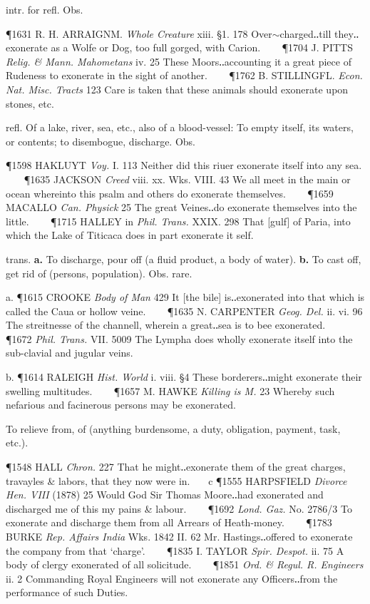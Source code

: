 \begin{description}[wide, labelwidth=!, labelindent=0pt]
\begin{myenumerate}
 intr. for refl. Obs.

\P 1631 R. H. ARRAIGNM.  \textit{Whole Creature} xiii. §1. 178 Over$\sim$charged‥till they‥exonerate as a Wolfe or Dog, too full gorged, with Carion.    
\P 1704 J. PITTS  \textit{Relig. \& Mann. Mahometans} iv. 25 These Moors‥accounting it a great piece of Rudeness to exonerate in the sight of another.    
\P 1762 B. STILLINGFL.  \textit{Econ. Nat. Misc. Tracts} 123 Care is taken that these animals should exonerate upon stones, etc.

 refl. Of a lake, river, sea, etc., also of a blood-vessel: To empty itself, its waters, or contents; to disembogue, discharge. Obs.

\P 1598 HAKLUYT  \textit{Voy.} I. 113 Neither did this riuer exonerate itself into any sea.    
\P 1635 JACKSON  \textit{Creed} viii. xx. Wks. VIII. 43 We all meet in the main or ocean whereinto this psalm and others do exonerate themselves.    
\P 1659 MACALLO  \textit{Can. Physick} 25 The great Veines‥do exonerate themselves into the little.    
\P 1715 HALLEY in  \textit{Phil. Trans.} XXIX. 298 That [gulf] of Paria, into which the Lake of Titicaca does in part exonerate it self.

 trans. \textbf{a.} To discharge, pour off (a fluid product, a body of water). \textbf{b.} To cast off, get rid of (persons, population). Obs. rare.

a. \P 1615 CROOKE  \textit{Body of Man} 429 It [the bile] is‥exonerated into that which is called the Caua or hollow veine.    
\P 1635 N. CARPENTER  \textit{Geog. Del.} ii. vi. 96 The streitnesse of the channell, wherein a great‥sea is to bee exonerated.    
\P 1672  \textit{Phil. Trans.} VII. 5009 The Lympha does wholly exonerate itself into the sub-clavial and jugular veins.

b. \P 1614 RALEIGH  \textit{Hist. World} i. viii. §4 These borderers‥might exonerate their swelling multitudes.    
\P 1657 M. HAWKE  \textit{Killing is M.} 23 Whereby such nefarious and facinerous persons may be exonerated.

 To relieve from, of (anything burdensome, a duty, obligation, payment, task, etc.).

\P 1548 HALL  \textit{Chron.} 227 That he might‥exonerate them of the great charges, travayles \& labors, that they now were in.    c 
\P 1555 HARPSFIELD  \textit{Divorce Hen. VIII} (1878) 25 Would God Sir Thomas Moore‥had exonerated and discharged me of this my pains \& labour.    
\P 1692  \textit{Lond. Gaz.} No. 2786/3 To exonerate and discharge them from all Arrears of Heath-money.    
\P 1783 BURKE  \textit{Rep. Affairs India} Wks. 1842 II. 62 Mr.  Hastings‥offered to exonerate the company from that ‘charge’.    
\P 1835 I. TAYLOR  \textit{Spir. Despot.} ii. 75 A body of clergy exonerated of all solicitude.    
\P 1851  \textit{Ord. \& Regul. R. Engineers} ii. 2 Commanding Royal Engineers will not exonerate any Officers‥from the performance of such Duties.


\end{myenumerate}
\end{description}
